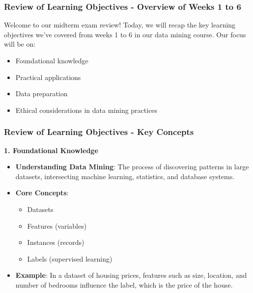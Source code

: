 \documentclass{beamer}
\begin{document}
\begin{frame}[fragile]
    \frametitle{Review of Learning Objectives - Overview of Weeks 1 to 6}
    Welcome to our midterm exam review! Today, we will recap the key learning objectives we’ve covered from weeks 1 to 6 in our data mining course. Our focus will be on:
    \begin{itemize}
        \item Foundational knowledge
        \item Practical applications
        \item Data preparation
        \item Ethical considerations in data mining practices
    \end{itemize}
\end{frame}

\begin{frame}[fragile]
    \frametitle{Review of Learning Objectives - Key Concepts}
    \textbf{1. Foundational Knowledge}
    \begin{itemize}
        \item \textbf{Understanding Data Mining}: The process of discovering patterns in large datasets, intersecting machine learning, statistics, and database systems.
        \item \textbf{Core Concepts}:
            \begin{itemize}
                \item Datasets
                \item Features (variables)
                \item Instances (records)
                \item Labels (supervised learning)
            \end{itemize}
        \item \textbf{Example}: In a dataset of housing prices, features such as size, location, and number of bedrooms influence the label, which is the price of the house.
    \end{itemize}
\end{frame}
\end{document}
